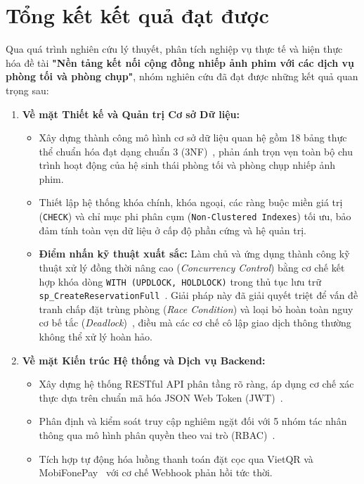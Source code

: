 \section{Tổng kết kết quả đạt được}

Qua quá trình nghiên cứu lý thuyết, phân tích nghiệp vụ thực tế và hiện thực hóa đề tài \textbf{"Nền tảng kết nối cộng đồng nhiếp ảnh phim với các dịch vụ phòng tối và phòng chụp"}, nhóm nghiên cứu đã đạt được những kết quả quan trọng sau:

\begin{enumerate}[leftmargin=2em]
    \item \textbf{Về mặt Thiết kế và Quản trị Cơ sở Dữ liệu:}
    \begin{itemize}
        \item Xây dựng thành công mô hình cơ sở dữ liệu quan hệ gồm 18 bảng thực thể chuẩn hóa đạt dạng chuẩn 3 (3NF)~\cite{silberschatz2020database}, phản ánh trọn vẹn toàn bộ chu trình hoạt động của hệ sinh thái phòng tối và phòng chụp nhiếp ảnh phim.
        \item Thiết lập hệ thống khóa chính, khóa ngoại, các ràng buộc miền giá trị (\texttt{CHECK}) và chỉ mục phi phân cụm (\texttt{Non-Clustered Indexes}) tối ưu, bảo đảm tính toàn vẹn dữ liệu ở cấp độ phần cứng và hệ quản trị.
        \item \textbf{Điểm nhấn kỹ thuật xuất sắc:} Làm chủ và ứng dụng thành công kỹ thuật xử lý đồng thời nâng cao (\textit{Concurrency Control}) bằng cơ chế kết hợp khóa dòng \texttt{WITH (UPDLOCK, HOLDLOCK)} trong thủ tục lưu trữ \texttt{sp\_CreateReservationFull}~\cite{microsoft2024locking}. Giải pháp này đã giải quyết triệt để vấn đề tranh chấp đặt trùng phòng (\textit{Race Condition}) và loại bỏ hoàn toàn nguy cơ bế tắc (\textit{Deadlock})~\cite{habibi2024towards, zhang2023adaptive}, điều mà các cơ chế cô lập giao dịch thông thường không thể xử lý hoàn hảo.
    \end{itemize}

    \item \textbf{Về mặt Kiến trúc Hệ thống và Dịch vụ Backend:}
    \begin{itemize}
        \item Xây dựng hệ thống RESTful API phân tầng rõ ràng, áp dụng cơ chế xác thực dựa trên chuẩn mã hóa JSON Web Token (JWT)~\cite{nugraha2023performance}.
        \item Phân định và kiểm soát truy cập nghiêm ngặt đối với 5 nhóm tác nhân thông qua mô hình phân quyền theo vai trò (RBAC)~\cite{sandhu2023role}.
        \item Tích hợp tự động hóa luồng thanh toán đặt cọc qua VietQR và MobiFonePay~\cite{wicaksono2023utilizing, sbv2021vietqr} với cơ chế Webhook phản hồi tức thời.
    \end{itemize}


\end{enumerate}
